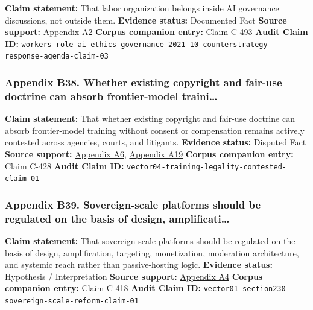 \documentclass[
  american,
  11pt,
  letterpaper,
]{article}
\begin{document}
\textbf{Claim statement:} That labor organization belongs inside AI
governance discussions, not outside them. \textbf{Evidence status:}
Documented Fact \textbf{Source support:}
\hyperref[appendix-a2-in-oxford-handbook-on-ai-governance-the-role-of-workers-in-ai-ethics-and-governance]{Appendix
A2} \textbf{Corpus companion entry:} Claim C-493 \textbf{Audit Claim
ID:}
\texttt{workers-role-ai-ethics-governance-2021-10-counterstrategy-response-agenda-claim-03}

\subsubsection{Appendix B38. Whether existing copyright and fair-use
doctrine can absorb frontier-model
traini\ldots{}}\label{appendix-b38-whether-existing-copyright-and-fair-use-doctrine-can-absorb-frontier-model-traini}

\textbf{Claim statement:} That whether existing copyright and fair-use
doctrine can absorb frontier-model training without consent or
compensation remains actively contested across agencies, courts, and
litigants. \textbf{Evidence status:} Disputed Fact \textbf{Source
support:}
\hyperref[appendix-a6-copyright-and-artificial-intelligence-part-3-generative-ai-training-pre-publication-version]{Appendix
A6},
\hyperref[appendix-a19-bartz-et-al-v-anthropic-pbc-order-on-fair-use]{Appendix
A19} \textbf{Corpus companion entry:} Claim C-428 \textbf{Audit Claim
ID:} \texttt{vector04-training-legality-contested-claim-01}

\subsubsection{Appendix B39. Sovereign-scale platforms should be
regulated on the basis of design,
amplificati\ldots{}}\label{appendix-b39-sovereign-scale-platforms-should-be-regulated-on-the-basis-of-design-amplificati}

\textbf{Claim statement:} That sovereign-scale platforms should be
regulated on the basis of design, amplification, targeting,
monetization, moderation architecture, and systemic reach rather than
passive-hosting logic. \textbf{Evidence status:} Hypothesis /
Interpretation \textbf{Source support:}
\hyperref[appendix-a4-a-look-behind-the-screens-examining-the-data-practices-of-social-media-and-video-streaming-services]{Appendix
A4} \textbf{Corpus companion entry:} Claim C-418 \textbf{Audit Claim
ID:} \texttt{vector01-section230-sovereign-scale-reform-claim-01}
\end{document}
